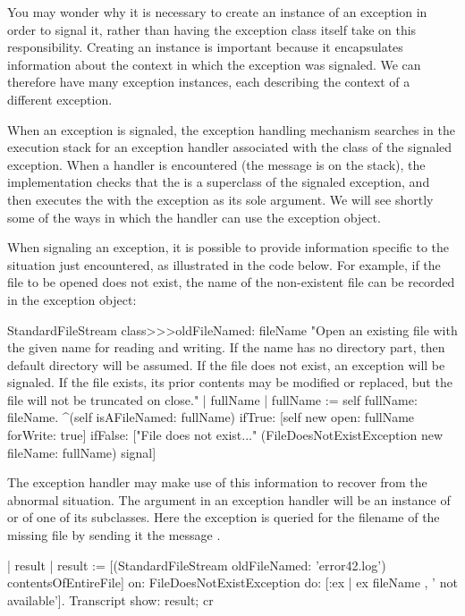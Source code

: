 You may wonder why it is necessary to create an instance of an exception in order to signal it, rather than having the exception class itself take on this responsibility. Creating an instance is important because it encapsulates information about the context in which the exception was signaled. We can therefore have many exception instances, each describing the context of a different exception.

When an exception is signaled, the exception handling mechanism searches in the execution stack for an exception handler associated with the class of the signaled exception. When a handler is encountered (\ie the message  is on the stack),
the implementation checks that the  is a superclass of the signaled exception, and then executes the  with the exception as its sole argument. We will see shortly some of the ways in which the handler can use the exception object.

When signaling an exception, it is possible to provide information specific to the situation just encountered, as illustrated in the code below. 
For example, if the file to be opened does not exist, the name of the non-existent file can be recorded in the exception object:

\begin{code}{}
StandardFileStream class>>>oldFileNamed: fileName
	"Open an existing file with the given name for reading and writing. If the name has no directory part, then default directory will be assumed. If the file does not exist, an exception will be signaled. If the file exists, its prior contents may be modified or replaced, but the file will not be truncated on close."
	| fullName |
	fullName := self fullName: fileName.
	^(self isAFileNamed: fullName)
		ifTrue: [self new open: fullName forWrite: true]
		ifFalse: ["File does not exist..."
			(FileDoesNotExistException new fileName: fullName) signal]
\end{code}

The exception handler may make use of this information to recover from the abnormal situation. The argument  in an exception handler \ct{[:ex | ...]} will be an instance of  or of one of its subclasses. Here the exception is queried for the filename of the missing file by sending it the message .

\begin{code}{}
| result |
result := [(StandardFileStream oldFileNamed: 'error42.log') contentsOfEntireFile]
	on: FileDoesNotExistException
	do: [:ex | ex fileName , ' not available'].
Transcript show: result; cr
\end{code}

